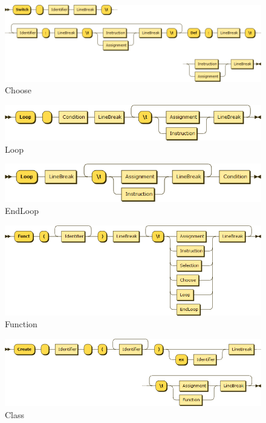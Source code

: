 \begin{figure}[h!]
\centering
\includegraphics[scale=0.4]{kepek/rr_choose.png}
\caption{Choose}
\label{fig:rr_choose}
\end{figure}

\begin{figure}[h!]
\centering
\includegraphics[scale=0.4]{kepek/rr_loop.png}
\caption{Loop}
\label{fig:rr_loop}
\end{figure}

\begin{figure}[h!]
\centering
\includegraphics[scale=0.4]{kepek/rr_endloop.png}
\caption{EndLoop}
\label{fig:rr_endloop}
\end{figure}

\begin{figure}[h!]
\centering
\includegraphics[scale=0.4]{kepek/rr_function.png}
\caption{Function}
\label{fig:rr_function}
\end{figure}

\begin{figure}[h!]
\centering
\includegraphics[scale=0.4]{kepek/rr_class.png}
\caption{Class}
\label{fig:rr_class}
\end{figure}

